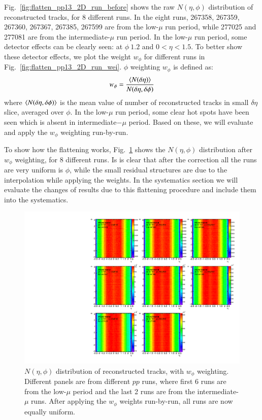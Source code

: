 Fig.~\ref{fig:flatten_pp13_2D_run_before} shows the raw $N(\eta,\phi)$ distribution of reconstructed tracks, for 8 different runs. In the eight runs, 267358, 267359, 267360, 267367, 267385, 267599 are from the low-$\mu$ run period, while 277025 and 277081 are from the intermediate-$\mu$ run period. In the low-$\mu$ run period, some detector effects can be clearly seen: at $\phi~1.2$ and $0<\eta<1.5$. To better show these detector effects, we plot the weight $w_{\phi}$ for different runs in Fig.~\ref{fig:flatten_pp13_2D_run_wei}. $\phi$ weighting $w_{\phi}$ is defined as:
\begin{equation}
w_{\phi}=\frac{\lr{N(\delta\eta)}}{N(\delta\eta,\delta\phi)}
\end{equation}
where $\lr{N(\delta\eta,\delta\phi)}$ is the mean value of number of reconstructed tracks in small $\delta\eta$ slice, averaged over $\phi$. In the low-$\mu$ run period, some clear hot spots have been seen which is absent in intermediate$-\mu$ period. Based on these, we will evaluate and apply the $w_{\phi}$ weighting run-by-run.

To show how the flattening works, Fig.~\ref{fig:flatten_pp13_2D_run_after} shows the $N(\eta,\phi)$ distribution after $w_{\phi}$ weighting, for 8 different runs. Is is clear that after the correction all the runs are very uniform is $\phi$, while the small residual structures are due to the interpolation while applying the weights. In the systematics section we will evaluate the changes of results due to this flattening procedure and include them into the systematics.

\begin{figure}[H]
\centering
\includegraphics[width=1.\linewidth]{figs/sec_ana/flatten_pp13_2D_run_after.pdf}
\caption{$N(\eta,\phi)$ distribution of reconstructed tracks, with $w_{\phi}$ weighting. Different panels are from different $pp$ runs, where first 6 runs are from the low-$\mu$ period and the last 2 runs are from the intermediate-$\mu$ runs. After applying the $w_{\phi}$ weights run-by-run, all runs are now equally uniform.}
\label{fig:flatten_pp13_2D_run_after}
\end{figure}


